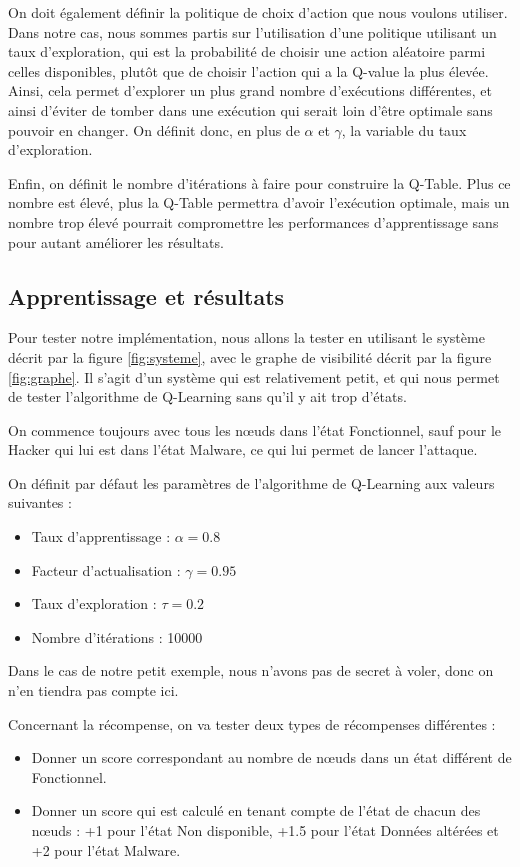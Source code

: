 \documentclass[a4paper]{article}
\begin{document}
    On doit également définir la politique de choix d'action que nous voulons utiliser.
    Dans notre cas, nous sommes partis sur l'utilisation d'une politique utilisant un taux d'exploration, qui est la probabilité de choisir une action aléatoire parmi celles disponibles, plutôt que de choisir l'action qui a la Q-value la plus élevée.
    Ainsi, cela permet d'explorer un plus grand nombre d'exécutions différentes, et ainsi d'éviter de tomber dans une exécution qui serait loin d'être optimale sans pouvoir en changer.
    On définit donc, en plus de $\alpha$ et $\gamma$, la variable du taux d'exploration.

    Enfin, on définit le nombre d'itérations à faire pour construire la Q-Table.
    Plus ce nombre est élevé, plus la Q-Table permettra d'avoir l'exécution optimale, mais un nombre trop élevé pourrait compromettre les performances d'apprentissage sans pour autant améliorer les résultats.

    \subsection{Apprentissage et résultats}

    Pour tester notre implémentation, nous allons la tester en utilisant le système décrit par la figure \ref{fig:systeme}, avec le graphe de visibilité décrit par la figure \ref{fig:graphe}.
    Il s'agit d'un système qui est relativement petit, et qui nous permet de tester l'algorithme de Q-Learning sans qu'il y ait trop d'états.

    On commence toujours avec tous les n\oe uds dans l'état Fonctionnel, sauf pour le Hacker qui lui est dans l'état Malware, ce qui lui permet de lancer l'attaque.

    On définit par défaut les paramètres de l'algorithme de Q-Learning aux valeurs suivantes :
    \begin{itemize}
        \item Taux d'apprentissage : $\alpha = 0.8$
        \item Facteur d'actualisation : $\gamma = 0.95$
        \item Taux d'exploration : $\tau = 0.2$
        \item Nombre d'itérations : 10000
    \end{itemize}

    Dans le cas de notre petit exemple, nous n'avons pas de secret à voler, donc on n'en tiendra pas compte ici.

    Concernant la récompense, on va tester deux types de récompenses différentes :
    \begin{itemize}
        \item Donner un score correspondant au nombre de n\oe uds dans un état différent de Fonctionnel.
        \item Donner un score qui est calculé en tenant compte de l'état de chacun des n\oe uds : +1 pour l'état Non disponible, +1.5 pour l'état Données altérées et +2 pour l'état Malware.
    \end{itemize}
\end{document}
